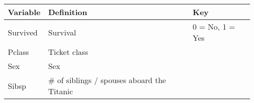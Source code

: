 \documentclass[11pt]{article}
\begin{document}
    \begin{longtable}[]{@{}lll@{}}
\toprule
\begin{minipage}[b]{0.11\columnwidth}\raggedright\strut
Variable\strut
\end{minipage} & \begin{minipage}[b]{0.11\columnwidth}\raggedright\strut
Definition\strut
\end{minipage} & \begin{minipage}[b]{0.11\columnwidth}\raggedright\strut
Key\strut
\end{minipage}\tabularnewline
\midrule
\endhead
\begin{minipage}[t]{0.11\columnwidth}\raggedright\strut
Survived\strut
\end{minipage} & \begin{minipage}[t]{0.11\columnwidth}\raggedright\strut
Survival\strut
\end{minipage} & \begin{minipage}[t]{0.11\columnwidth}\raggedright\strut
0 = No, 1 = Yes\strut
\end{minipage}\tabularnewline
\begin{minipage}[t]{0.11\columnwidth}\raggedright\strut
Pclass\strut
\end{minipage} & \begin{minipage}[t]{0.11\columnwidth}\raggedright\strut
Ticket class\strut
\end{minipage} & \begin{minipage}[t]{0.11\columnwidth}\raggedright\strut
\strut
\end{minipage}\tabularnewline
\begin{minipage}[t]{0.11\columnwidth}\raggedright\strut
Sex\strut
\end{minipage} & \begin{minipage}[t]{0.11\columnwidth}\raggedright\strut
Sex\strut
\end{minipage} & \begin{minipage}[t]{0.11\columnwidth}\raggedright\strut
\strut
\end{minipage}\tabularnewline
\begin{minipage}[t]{0.11\columnwidth}\raggedright\strut
Sibsp\strut
\end{minipage} & \begin{minipage}[t]{0.11\columnwidth}\raggedright\strut
\# of siblings / spouses aboard the Titanic\strut
\end{minipage} & \begin{minipage}[t]{0.11\columnwidth}\raggedright\strut

\end{minipage}
\end{longtable}
\end{document}

